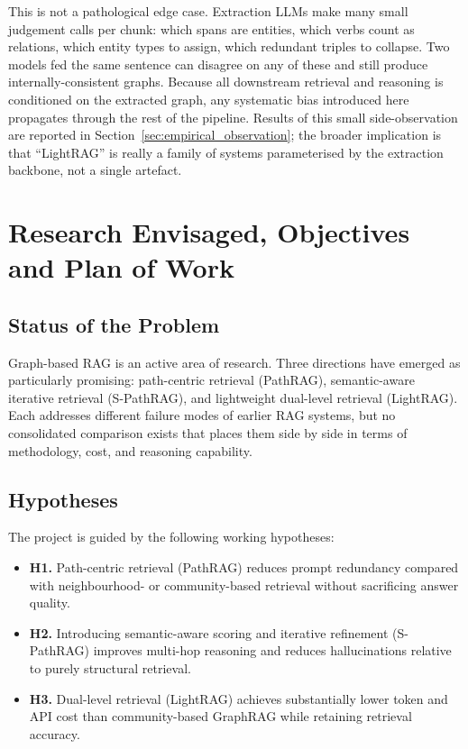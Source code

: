 \documentclass[12pt,a4paper,oneside]{report}
\begin{document}
This is not a pathological edge case. Extraction LLMs make many small
judgement calls per chunk: which spans are entities, which verbs count
as relations, which entity types to assign, which redundant triples to
collapse. Two models fed the same sentence can disagree on any of these
and still produce internally-consistent graphs. Because all downstream
retrieval and reasoning is conditioned on the extracted graph, any
systematic bias introduced here propagates through the rest of the
pipeline. Results of this small side-observation are reported in
Section~\ref{sec:empirical_observation}; the broader implication is
that ``LightRAG'' is really a family of systems parameterised by the
extraction backbone, not a single artefact.

\chapter{Research Envisaged, Objectives and Plan of Work}
\label{ch:research_plan}

\section{Status of the Problem}

Graph-based RAG is an active area of research. Three directions have emerged
as particularly promising: path-centric retrieval (PathRAG), semantic-aware
iterative retrieval (S-PathRAG), and lightweight dual-level retrieval
(LightRAG). Each addresses different failure modes of earlier RAG systems,
but no consolidated comparison exists that places them side by side in terms
of methodology, cost, and reasoning capability.

\section{Hypotheses}

The project is guided by the following working hypotheses:
\begin{itemize}[leftmargin=2em,itemsep=2pt]
    \item \textbf{H1.} Path-centric retrieval (PathRAG) reduces prompt
          redundancy compared with neighbourhood- or community-based retrieval
          without sacrificing answer quality.
    \item \textbf{H2.} Introducing semantic-aware scoring and iterative
          refinement (S-PathRAG) improves multi-hop reasoning and reduces
          hallucinations relative to purely structural retrieval.
    \item \textbf{H3.} Dual-level retrieval (LightRAG) achieves substantially
          lower token and API cost than community-based GraphRAG while
          retaining retrieval accuracy.
\end{itemize}
\end{document}
